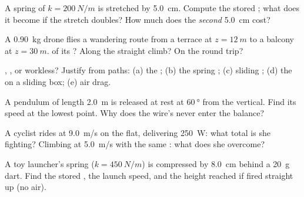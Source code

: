 \begin{exercise}[$\star$]\label{exo:g12:work-and-energy:1}
A spring of  $k = \qty{200}{N/m}$ is stretched by
\qty{5.0}{cm}. Compute the stored ; what does it become if the
stretch doubles? How much does the \emph{second} \qty{5.0}{cm} cost?
\end{exercise}

\begin{exercise}[$\star$]\label{exo:g12:work-and-energy:2}
A \qty{0.90}{kg} drone flies a wandering route from a terrace at
$z = \qty{12}{m}$ to a balcony at $z = \qty{30}{m}$.  of its
? Along the straight climb? On the round trip?
\end{exercise}

\begin{exercise}[$\star$]\label{exo:g12:work-and-energy:3}
, , or workless? Justify from paths:
(a) the ; (b) the spring ; (c) sliding ; (d) the
 on a sliding box; (e) air drag.
\end{exercise}

\begin{exercise}[$\star$]\label{exo:g12:work-and-energy:4}
A pendulum of length \qty{2.0}{m} is released at rest at
$\qty{60}{\degree}$ from the vertical. Find its speed at the lowest
point. Why does the wire's  never enter the balance?
\end{exercise}

\begin{exercise}[$\star$]\label{exo:g12:work-and-energy:5}
A cyclist rides at \qty{9.0}{m/s} on the flat, delivering
\qty{250}{W}: what total   is she fighting? Climbing at
\qty{5.0}{m/s} with the same : what  does she overcome?
\end{exercise}

\begin{exercise}[$\star\star$]\label{exo:g12:work-and-energy:6}
A toy launcher's spring ($k = \qty{450}{N/m}$) is compressed by
\qty{8.0}{cm} behind a \qty{20}{g} dart. Find the stored , the
launch speed, and the height reached if fired straight up (no air).
\end{exercise}


